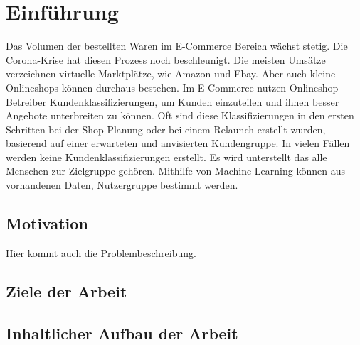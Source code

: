 \chapter{Einführung}
Das Volumen der bestellten Waren im E-Commerce Bereich wächst stetig. Die Corona-Krise hat diesen Prozess noch beschleunigt. Die meisten Umsätze verzeichnen virtuelle Marktplätze, wie Amazon und Ebay. Aber auch kleine Onlineshops können durchaus bestehen.
Im E-Commerce nutzen Onlineshop Betreiber Kundenklassifizierungen, um Kunden einzuteilen und ihnen besser Angebote unterbreiten zu können. Oft sind diese Klassifizierungen in den ersten Schritten bei der Shop-Planung oder bei einem Relaunch erstellt wurden, basierend auf einer erwarteten und anvisierten Kundengruppe. In vielen Fällen werden keine Kundenklassifizierungen erstellt. Es wird unterstellt das alle Menschen zur Zielgruppe gehören.
Mithilfe von Machine Learning können aus vorhandenen Daten, Nutzergruppe bestimmt werden.

\section{Motivation}
Hier kommt auch die Problembeschreibung.
\section{Ziele der Arbeit}
\section{Inhaltlicher Aufbau der Arbeit}
